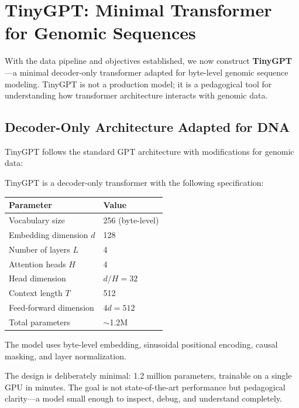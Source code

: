 \section{TinyGPT: Minimal Transformer for Genomic Sequences}
\label{sec:tinygpt}

With the data pipeline and objectives established, we now construct \textbf{TinyGPT}---a minimal decoder-only transformer adapted for byte-level genomic sequence modeling. TinyGPT is not a production model; it is a pedagogical tool for understanding how transformer architecture interacts with genomic data.

\subsection{Decoder-Only Architecture Adapted for DNA}

TinyGPT follows the standard GPT architecture \citep{radford2019} with modifications for genomic data:

\begin{dogmadef}
TinyGPT is a decoder-only transformer with the following specification:
\begin{center}
\renewcommand{\arraystretch}{1.15}
\begin{tabularx}{0.75\textwidth}{l Y}
\toprule
\textbf{Parameter} & \textbf{Value} \\
\midrule
Vocabulary size & 256 (byte-level) \\
Embedding dimension $d$ & 128 \\
Number of layers $L$ & 4 \\
Attention heads $H$ & 4 \\
Head dimension & $d / H = 32$ \\
Context length $T$ & 512 \\
Feed-forward dimension & $4d = 512$ \\
Total parameters & $\sim$1.2M \\
\bottomrule
\end{tabularx}
\end{center}
The model uses byte-level embedding, sinusoidal positional encoding, causal masking, and layer normalization.
\end{dogmadef}

The design is deliberately minimal: 1.2 million parameters, trainable on a single GPU in minutes. The goal is not state-of-the-art performance but pedagogical clarity---a model small enough to inspect, debug, and understand completely.

